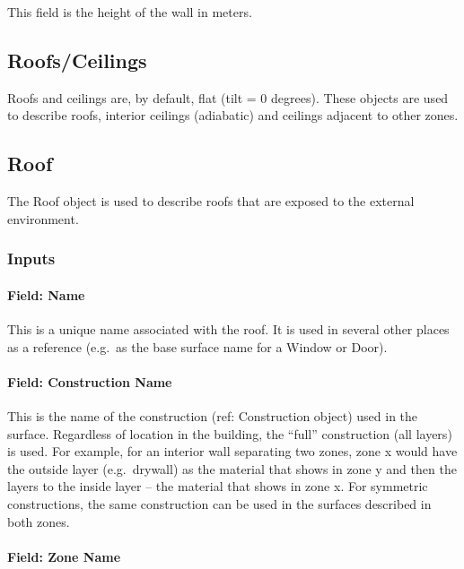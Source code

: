 This field is the height of the wall in meters.

\subsection{Roofs/Ceilings}\label{roofsceilings}

Roofs and ceilings are, by default, flat (tilt = 0 degrees). These objects are used to describe roofs, interior ceilings (adiabatic) and ceilings adjacent to other zones.

\subsection{Roof}\label{roof}

The Roof object is used to describe roofs that are exposed to the external environment.

\subsubsection{Inputs}\label{inputs-8-026}

\paragraph{Field: Name}\label{field-name-4-030}

This is a unique name associated with the roof. It is used in several other places as a reference (e.g.~as the base surface name for a Window or Door).

\paragraph{Field: Construction Name}\label{field-construction-name-4}

This is the name of the construction (ref: Construction object) used in the surface. Regardless of location in the building, the ``full'' construction (all layers) is used. For example, for an interior wall separating two zones, zone x would have the outside layer (e.g.~drywall) as the material that shows in zone y and then the layers to the inside layer -- the material that shows in zone x. For symmetric constructions, the same construction can be used in the surfaces described in both zones.

\paragraph{Field: Zone Name}\label{field-zone-name-4-006}


